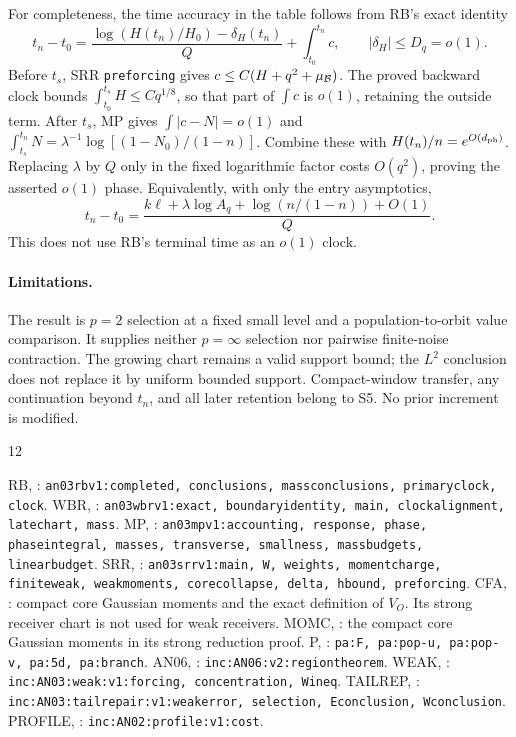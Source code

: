 \documentclass[11pt]{article}
\numberwithin{equation}{section}
\theoremstyle{remark}\newtheorem{remark}[theorem]{Remark}
\begin{document}
For completeness, the time accuracy in the table follows from RB's
exact identity
\[
 t_n-t_0=\frac{\log(H(t_n)/H_0)-\delta_H(t_n)}Q
                         +\int_{t_0}^{t_n}c,\qquad
 |\delta_H|\le D_q=o(1).
\]
Before $t_s$, SRR \texttt{preforcing} gives
$c\le C(H+q^2+\mu_\mathcal B)$. The proved backward clock bounds
$\int_{t_0}^{t_s}H\le Cq^{1/8}$, so that part of $\int c$
is $o(1)$, retaining the outside term.
After $t_s$, MP gives $\int|c-N|=o(1)$ and
$\int_{t_s}^{t_n}N=\lambda^{-1}
\log[(1-N_0)/(1-n)]$. Combine these with
$H(t_n)/n=e^{O(d_{\rm ph})}$.
Replacing $\lambda$ by $Q$ only in the fixed logarithmic
factor costs $O(q^2)$, proving the asserted $o(1)$ phase.
Equivalently, with only the entry asymptotics,
\[
 t_n-t_0=
 \frac{k\ell+\lambda\log A_q+\log(n/(1-n))+O(1)}Q.
\]
This does not use RB's terminal time as an $o(1)$ clock.

\paragraph{Limitations.}
The result is $p=2$ selection at a fixed small level and a
population-to-orbit value comparison. It supplies neither
$p=\infty$ selection nor pairwise finite-noise contraction.
The growing chart remains a valid support bound; the $L^2$
conclusion does not replace it by uniform bounded support.
Compact-window transfer, any continuation beyond $t_n$, and all
later retention belong to S5. No prior increment is modified.

\begin{thebibliography}{12}\small\raggedright
{} RB, :
\texttt{an03rbv1:completed, conclusions, massconclusions, primaryclock, clock}.
 WBR, :
\texttt{an03wbrv1:exact, boundaryidentity, main, clockalignment, latechart, mass}.
 MP, :
\texttt{an03mpv1:accounting, response, phase, phaseintegral, masses,
transverse, smallness, massbudgets, linearbudget}.
 SRR, :
\texttt{an03srrv1:main, W, weights, momentcharge, finiteweak, weakmoments,
corecollapse, delta, hbound, preforcing}.
 CFA, :
compact core Gaussian moments and the exact definition of $V_O$.
Its strong receiver chart is not used for weak receivers.
 MOMC, :
the compact core Gaussian moments in its strong reduction proof.
 P, :
\texttt{pa:F, pa:pop-u, pa:pop-v, pa:5d, pa:branch}.
 AN06, :
\texttt{inc:AN06:v2:regiontheorem}.
 WEAK, :
\texttt{inc:AN03:weak:v1:forcing, concentration, Wineq}.
 TAILREP,
:
\texttt{inc:AN03:tailrepair:v1:weakerror, selection, Econclusion, Wconclusion}.
 PROFILE,
:
\texttt{inc:AN02:profile:v1:cost}.
\end{thebibliography}
\end{document}
